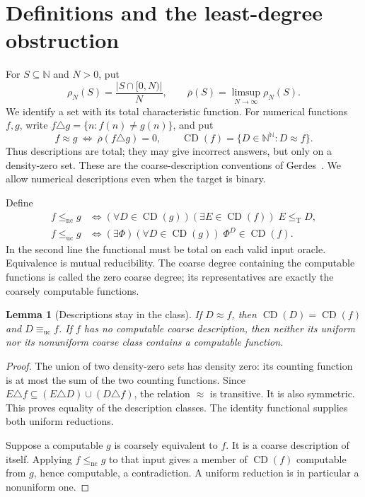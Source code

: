 \documentclass[11pt,a4paper]{article}
\newcommand{\N}{\mathbb N}
\newcommand{\Baire}{\N^{\N}}
\newcommand{\leT}{\leq_{\mathrm T}}
\newcommand{\CD}{\operatorname{CD}}
\newcommand{\nc}{\mathrm{nc}}
\newcommand{\uc}{\mathrm{uc}}
\newcommand{\udens}{\overline\rho}
\newtheorem{lemma}[theorem]{Lemma}
\theoremstyle{definition}
\theoremstyle{remark}
\begin{document}
\section{Definitions and the least-degree obstruction}\label{sec:definitions}
For $S\subseteq\N$ and $N>0$, put
\[
 \rho_N(S)=\frac{|S\cap[0,N)|}{N},\qquad
 \udens(S)=\limsup_{N\to\infty}\rho_N(S).
\]
We identify a set with its total characteristic function. For numerical
functions $f,g$, write $f\triangle g=\{n:f(n)\ne g(n)\}$, and put
\[
 f\approx g\ \Longleftrightarrow\ \udens(f\triangle g)=0,
 \qquad \CD(f)=\{D\in\Baire:D\approx f\}.
\]
Thus descriptions are total; they may give incorrect answers, but only on
a density-zero set. These are the coarse-description conventions of
Gerdes~\cite{Gerdes}. We allow numerical descriptions even when the target
is binary.

Define
\begin{align*}
 f\le_{\nc}g
 &\Longleftrightarrow
 (\forall D\in\CD(g))(\exists E\in\CD(f))\;E\leT D,\\
 f\le_{\uc}g
 &\Longleftrightarrow
 (\exists\Phi)(\forall D\in\CD(g))\;\Phi^D\in\CD(f).
\end{align*}
In the second line the functional must be total on each valid input oracle.
Equivalence is mutual reducibility. The coarse degree containing the computable functions is
called the zero coarse degree; its representatives are exactly the
coarsely computable functions.

\begin{lemma}[Descriptions stay in the class]\label{lem:descriptions}
If $D\approx f$, then $\CD(D)=\CD(f)$ and $D\equiv_{\uc}f$.
If $f$ has no computable coarse description, then neither its uniform nor
its nonuniform coarse class contains a computable function.
\end{lemma}
\begin{proof}
The union of two density-zero sets has density zero: its counting function
is at most the sum of the two counting functions. Since
$E\triangle f\subseteq(E\triangle D)\cup(D\triangle f)$, the relation
$\approx$ is transitive. It is also symmetric. This proves equality of the
description classes. The identity functional supplies both uniform reductions.

Suppose a computable $g$ is coarsely equivalent to $f$. It is a coarse
description of itself. Applying $f\le_{\nc}g$ to that input gives a member
of $\CD(f)$ computable from $g$, hence computable, a contradiction.
A uniform reduction is in particular a nonuniform one.
\end{proof}
\end{document}
